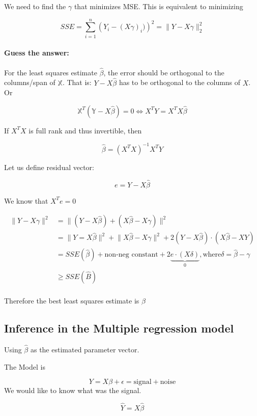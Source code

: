 \documentclass{report}
\begin{document}
We need to find the $\gamma$ that minimizes MSE. This is equivalent to minimizing 

\[
SSE = \sum_{i=1}^{n} \left( Y_{i} - (X\gamma)_{i}) \right) ^{2} = \lVert Y - X\gamma \rVert_{2}^{2}
\]

\paragraph{Guess the answer:} For the least squares estimate $\hat \beta$, the error should be orthogonal to the columns/span of $\mathbb{X}$. That is: $Y - X \hat \beta$ has to be orthogonal to the columns of $X$. Or 

\[
\mathbb{X}^{T} (\mathbb{Y} - X \hat \beta)  = 0 \iff X^{T}Y = X^{T}X\hat \beta 
\]

If $X^{T}X$ is full rank and thus invertible, then 

\[
\hat \beta = \left( X^{T} X \right)^{-1} X^{T}Y
\]


Let us define residual vector: 

\[
e = Y - X\hat \beta 
\]

We know that $X^{T}e = 0$ 

\begin{align*}
	\lVert Y - X\gamma \rVert^{2} &= \lVert (Y - X \hat \beta) + (X \hat \beta - X \gamma)\rVert^{2}  \\
	&= \lVert Y = X\hat \beta\rVert^{2} + \lVert X \hat \beta - X\gamma \rVert^{2} + 2 (Y- X\hat \beta) \cdot  (X \hat \beta - XY) \\
	&= SSE(\hat \beta ) + \text{non-neg constant} + 2 \underbrace{e \cdot (X \delta)}_{0}, \text{where} \delta = \hat \beta - \gamma \\
	&\ge SSE(\hat B) \\
\end{align*}

Therefore the best least squares estimate is $\hat \beta$ 


\subsection{Inference in the Multiple regression model}

Using $\hat \beta$ as the estimated parameter vector.

The Model is 

\[
Y = X \beta  + \epsilon = \text{signal} + \text{noise}
\]
We would like to know what was the signal. 

\[
\hat Y = X \hat \beta
\]
\end{document}
